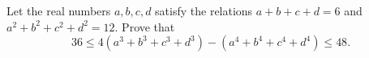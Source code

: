 Let the real numbers $a,b,c,d$ satisfy the relations $a+b+c+d=6$ and $a^2+b^2+c^2+d^2=12.$ Prove that\[36 \leq 4 \left(a^3+b^3+c^3+d^3\right) - \left(a^4+b^4+c^4+d^4 \right) \leq 48.\]